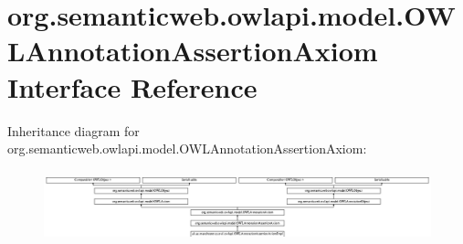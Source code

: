 \hypertarget{interfaceorg_1_1semanticweb_1_1owlapi_1_1model_1_1_o_w_l_annotation_assertion_axiom}{\section{org.\-semanticweb.\-owlapi.\-model.\-O\-W\-L\-Annotation\-Assertion\-Axiom Interface Reference}
\label{interfaceorg_1_1semanticweb_1_1owlapi_1_1model_1_1_o_w_l_annotation_assertion_axiom}
}
Inheritance diagram for org.\-semanticweb.\-owlapi.\-model.\-O\-W\-L\-Annotation\-Assertion\-Axiom\-:\begin{figure}[H]
\begin{center}
\leavevmode
\includegraphics[height=2.094763cm]{interfaceorg_1_1semanticweb_1_1owlapi_1_1model_1_1_o_w_l_annotation_assertion_axiom}
\end{center}
\end{figure}
